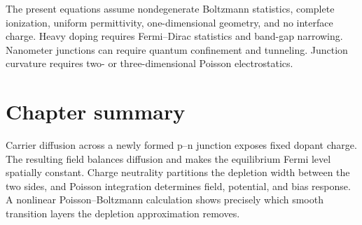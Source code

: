 \begin{boundarybox}
The present equations assume nondegenerate Boltzmann statistics, complete
ionization, uniform permittivity, one-dimensional geometry, and no interface
charge.  Heavy doping requires Fermi--Dirac statistics and band-gap narrowing.
Nanometer junctions can require quantum confinement and tunneling.  Junction
curvature requires two- or three-dimensional Poisson electrostatics.
\end{boundarybox}

\section{Chapter summary}

Carrier diffusion across a newly formed p--n junction exposes fixed dopant
charge.  The resulting field balances diffusion and makes the equilibrium
Fermi level spatially constant.  Charge neutrality partitions the depletion
width between the two sides, and Poisson integration determines field,
potential, and bias response.  A nonlinear Poisson--Boltzmann calculation
shows precisely which smooth transition layers the depletion approximation
removes.
